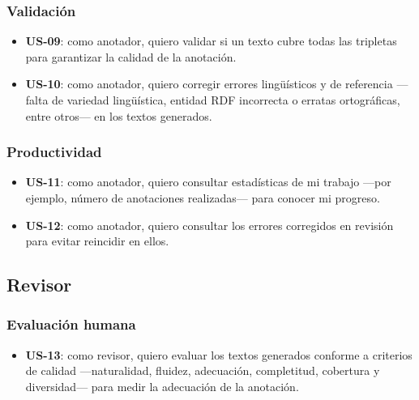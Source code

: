 \subsubsection{Validación}
\begin{itemize}
	\item \textbf{US-09}: como anotador, quiero validar si un texto cubre todas las
	      tripletas para garantizar la calidad de la anotación.
	\item \textbf{US-10}: como anotador, quiero corregir errores lingüísticos y de
	      referencia ---falta de variedad lingüística, entidad RDF incorrecta o erratas
	      ortográficas, entre otros--- en los textos generados.
\end{itemize}

\subsubsection{Productividad}
\begin{itemize}
	\item \textbf{US-11}: como anotador, quiero consultar estadísticas de mi trabajo ---por
	      ejemplo, número de anotaciones realizadas--- para conocer mi progreso.
	\item \textbf{US-12}: como anotador, quiero consultar los errores corregidos en
	      revisión para evitar reincidir en ellos.
\end{itemize}

\subsection{Revisor}

\subsubsection{Evaluación humana}
\begin{itemize}
	\item \textbf{US-13}: como revisor, quiero evaluar los textos generados conforme a
	      criterios de calidad ---naturalidad, fluidez, adecuación, completitud, cobertura
	      y diversidad--- para medir la adecuación de la anotación.
\end{itemize}

